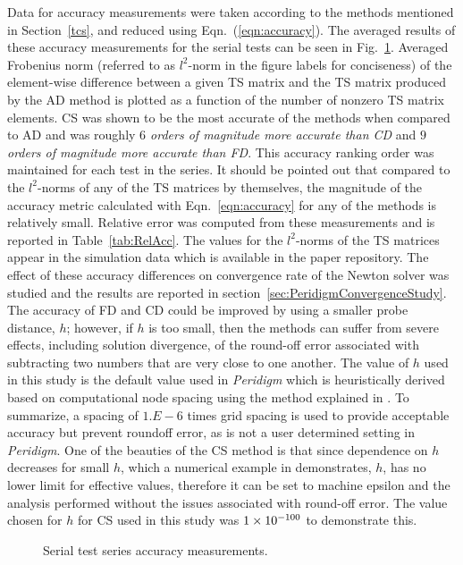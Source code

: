 \documentclass[preprint,12pt]{elsarticle}
\begin{document}
Data for accuracy measurements were taken according to the methods mentioned in
Section~\ref{tcs}, and reduced using Eqn.~(\ref{eqn:accuracy}). The
averaged results of these accuracy measurements for the serial tests can be
seen in Fig.~\ref{fig:serial_accuracy}. Averaged Frobenius norm (referred to as
$l^2$-norm in the figure labels for conciseness) of the element-wise difference
between a given TS matrix and the TS matrix produced by the AD method is
plotted as a function of the number of nonzero TS matrix elements. CS was shown
to be the most accurate of the methods when compared to AD and was roughly
\emph{$6$ orders of magnitude more accurate than CD} and \emph{$9$ orders of
magnitude more accurate than FD}. This accuracy ranking order was maintained
for each test in the series. It should be pointed out that compared to the
$l^2$-norms of any of the TS matrices by themselves, the magnitude of the
accuracy metric calculated with Eqn.~\ref{eqn:accuracy} for any of the methods
is relatively small. Relative error was computed from these measurements and is reported in
Table~\ref{tab:RelAcc}. The values for the $l^2$-norms of the TS matrices appear
in the simulation data which is available in the paper repository. The effect
of these accuracy differences on convergence rate of the Newton solver was studied and the
results are reported in section~\ref{sec:PeridigmConvergenceStudy}.  
%
The accuracy of FD and CD could be improved by using a smaller probe distance,
$h$; however, if $h$ is too small, then the methods can suffer from severe
effects, including solution divergence, of the round-off error associated with
subtracting two numbers that are very close to one another.  The value of $h$
used in this study is the default value used in \emph{Peridigm} which is
heuristically derived based on computational node spacing using the method explained in \cite[pp. 90]{ref-Adaggio}.  
To summarize, a spacing of $1.E-6$ times grid spacing is used to provide acceptable accuracy but prevent roundoff error, 
as is not a user determined setting in \emph{Peridigm}. One of the beauties
of the CS method is that since dependence on $h$ decreases for small $h$, which
a numerical example in \cite[Table 1]{squire1998using} demonstrates, $h$,
has no lower limit for effective values, therefore it can be set to machine epsilon and the
analysis performed without the issues associated with round-off error. The
value chosen for $h$ for CS used in this study was $\num{1.E-100}$ to
demonstrate this.
%
\begin{figure}[tbp] \centering
\scalebox{1.0}{} \caption{Serial test series
accuracy measurements.} \label{fig:serial_accuracy} \end{figure}
\end{document}
